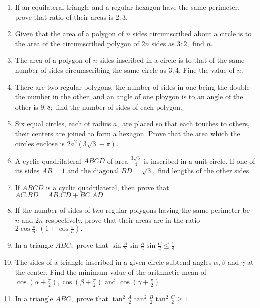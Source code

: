 \begin{enumerate}
\item If an equilateral triangle and a regular hexagon have the same perimeter, prove that ratio of their areas is $2:3.$

\item Given that the area of a polygon of $n$ sides circumscribed about a circle is to the area of the circumscribed polygon of
   $2n$ sides as $3:2,$ find $n.$

\item The area of a polygon of $n$ sides inscribed in a circle is to that of the same number of sides circumscribing the same
   circle as $3:4.$ Fine the value of $n.$

\item There are two regular polygons, the number of sides in one being the double the number in the other, and an angle of one ploygon
   is to an angle of the other is $9:8;$ find the number of sides of each polygon.

\item Six equal circles, each of radius $a,$ are placed so that each touches to others, their centers are joined to form a
   hexagon. Prove that the area which the circles enclose is $2a^2(3\sqrt{3} - \pi).$

\item A cyclic quadrilateral $ABCD$ of area $\frac{3\sqrt{3}}{4}$ is inscribed in a unit circle. If one of its sides
   $AB = 1$ and the diagonal $BD=\sqrt{3},$ find lengths of the other sides.

\item If $ABCD$ is a cyclic quadrilateral, then prove that $AC.BD = AB.CD + BC.AD$

\item If the number of sides of two regular polygons having the same perimeter be $n$ and $2n$ respectively, prove that
   their areas are in the ratio $2\cos\frac{\pi}{n}:\left(1 + \cos\frac{\pi}{n}\right).$

\item In a triangle $ABC,$ prove that $\sin \frac{A}{2}\sin \frac{B}{2}\sin \frac{C}{2}\leq \frac{1}{8}$

\item The sides of a triangle inscribed in a given circle subtend angles $\alpha, \beta$ and $\gamma$ at the center. Find
   the minimum value of the arithmetic mean of $\cos\left(\alpha + \frac{\pi}{2}\right), \cos\left(\beta + \frac{\pi}{2}\right)$ and
   $\cos\left(\gamma + \frac{\pi}{2}\right)$

\item In a triangle $ABC,$ prove that $\tan^2\frac{A}{2}\tan^2\frac{B}{2}\tan^2\frac{C}{2} \geq 1$


\end{enumerate}
